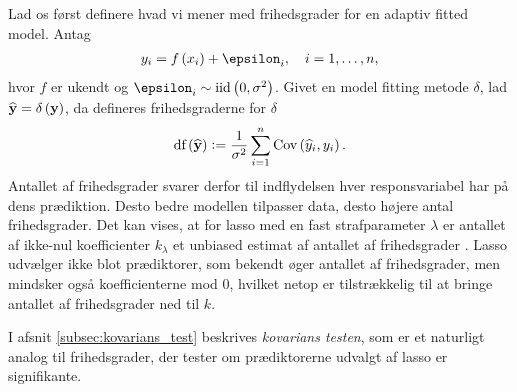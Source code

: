 Lad os først definere hvad vi mener med frihedsgrader for en adaptiv fitted model. 
Antag
\begin{align*}
y_i = f \del{x_i} + \epsilon_i, \quad i = 1, \ldots, n,
\end{align*}
hvor \(f\) er ukendt og \(\epsilon_i \sim \text{iid} \del{0, \sigma^2}\).
Givet en model fitting metode \(\delta\), lad \(\widehat{\y} = \delta \del{\y}\), da defineres frihedsgraderne for \(\delta\) 
\begin{align}
\text{df}\del{\widehat{\y}} := \frac{1}{\sigma^2} \sum_{i=1}^n \text{Cov}\del{\widehat{y}_i, y_i}. \label{eq:df_lasso}
\end{align}
Antallet af frihedsgrader svarer derfor til indflydelsen hver responsvariabel har på dens prædiktion.
Desto bedre modellen tilpasser data, desto højere antal frihedsgrader.
Det kan vises, at for lasso med en fast strafparameter \(\lambda\) er antallet af ikke-nul koefficienter \(k_\lambda\) et unbiased estimat af antallet af frihedsgrader \citep{df_lasso}.
%
Lasso udvælger ikke blot prædiktorer, som bekendt øger antallet af frihedsgrader, men mindsker også koefficienterne mod 0, hvilket netop er tilstrækkelig til at bringe antallet af frihedsgrader ned til \(k\).

I afsnit \ref{subsec:kovarians_test} beskrives \textit{kovarians testen}, som er et naturligt analog til frihedsgrader, der tester om prædiktorerne udvalgt af lasso er signifikante.

